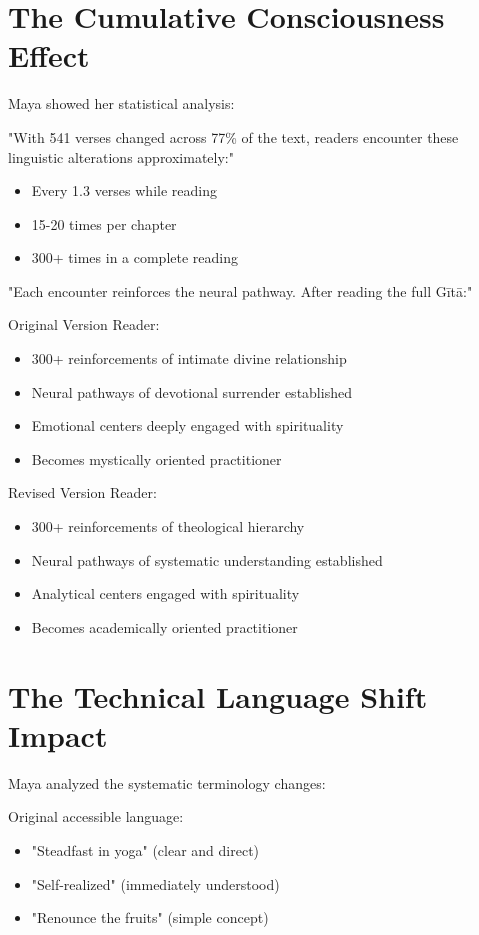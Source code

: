 \documentclass[11pt,twoside]{book}
\begin{document}
\section*{The Cumulative Consciousness Effect}
\label{sec:org917a886}

Maya showed her statistical analysis:

"With 541 verses changed across 77\% of the text, readers encounter these linguistic alterations approximately:"
\begin{itemize}
\item Every 1.3 verses while reading
\item 15-20 times per chapter
\item 300+ times in a complete reading
\end{itemize}

"Each encounter reinforces the neural pathway. After reading the full Gītā:"

Original Version Reader:
\begin{itemize}
\item 300+ reinforcements of intimate divine relationship
\item Neural pathways of devotional surrender established
\item Emotional centers deeply engaged with spirituality
\item Becomes mystically oriented practitioner
\end{itemize}

Revised Version Reader:
\begin{itemize}
\item 300+ reinforcements of theological hierarchy
\item Neural pathways of systematic understanding established
\item Analytical centers engaged with spirituality
\item Becomes academically oriented practitioner
\end{itemize}
\section*{The Technical Language Shift Impact}
\label{sec:org12376c1}

Maya analyzed the systematic terminology changes:

Original accessible language:
\begin{itemize}
\item "Steadfast in yoga" (clear and direct)
\item "Self-realized" (immediately understood)
\item "Renounce the fruits" (simple concept)
\end{itemize}
\end{document}
